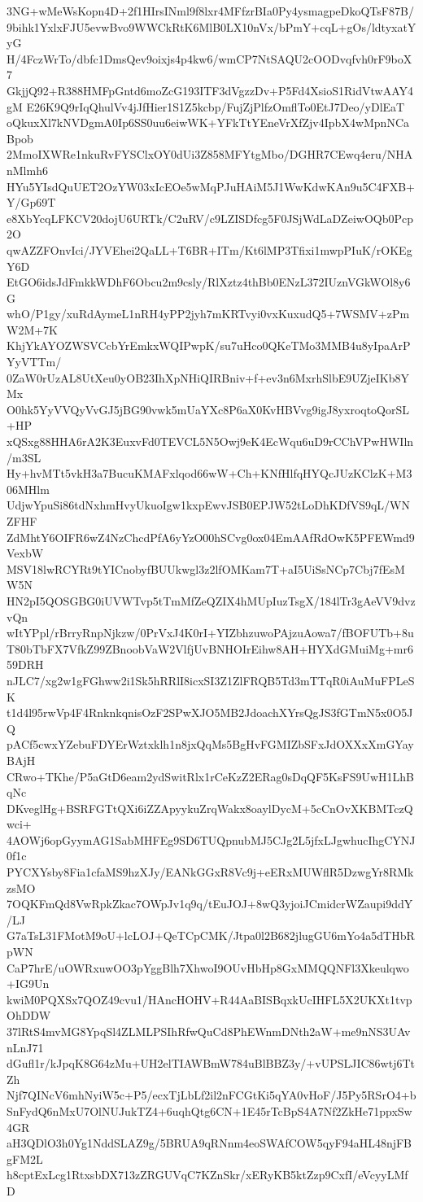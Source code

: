 3NG+wMeWsKopn4D+2f1HIrsINml9f8lxr4MFfzrBIa0Py4ysmagpeDkoQTsF87B/
9bihk1YxlxFJU5evwBvo9WWCkRtK6MlB0LX10nVx/bPmY+cqL+gOs/ldtyxatYyG
H/4FczWrTo/dbfc1DmsQev9oixjs4p4kw6/wmCP7NtSAQU2cOODvqfvh0rF9boX7
GkjjQ92+R388HMFpGntd6moZcG193ITF3dVgzzDv+P5Fd4XsioS1RidVtwAAY4gM
E26K9Q9rIqQhulVv4jJfHier1S1Z5kcbp/FujZjPlfzOmflTo0EtJ7Deo/yDlEaT
oQkuxXl7kNVDgmA0Ip6SS0uu6eiwWK+YFkTtYEneVrXfZjv4IpbX4wMpnNCaBpob
2MmoIXWRe1nkuRvFYSClxOY0dUi3Z858MFYtgMbo/DGHR7CEwq4eru/NHAnMlmh6
HYu5YIsdQuUET2OzYW03xIcEOe5wMqPJuHAiM5J1WwKdwKAn9u5C4FXB+Y/Gp69T
e8XbYcqLFKCV20dojU6URTk/C2uRV/c9LZISDfcg5F0JSjWdLaDZeiwOQb0Pcp2O
qwAZZFOnvIci/JYVEhei2QaLL+T6BR+ITm/Kt6lMP3Tfixi1mwpPIuK/rOKEgY6D
EtGO6idsJdFmkkWDhF6Obcu2m9csly/RlXztz4thBb0ENzL372IUznVGkWOl8y6G
whO/P1gy/xuRdAymeL1nRH4yPP2jyh7mKRTvyi0vxKuxudQ5+7WSMV+zPmW2M+7K
KhjYkAYOZWSVCcbYrEmkxWQIPwpK/su7uHco0QKeTMo3MMB4u8yIpaArPYyVTTm/
0ZaW0rUzAL8UtXeu0yOB23IhXpNHiQIRBniv+f+ev3n6MxrhSlbE9UZjeIKb8YMx
O0hk5YyVVQyVvGJ5jBG90vwk5mUaYXc8P6aX0KvHBVvg9igJ8yxroqtoQorSL+HP
xQSxg88HHA6rA2K3EuxvFd0TEVCL5N5Owj9eK4EcWqu6uD9rCChVPwHWIln/m3SL
Hy+hvMTt5vkH3a7BucuKMAFxlqod66wW+Ch+KNfHlfqHYQcJUzKClzK+M306MHlm
UdjwYpuSi86tdNxhmHvyUkuoIgw1kxpEwvJSB0EPJW52tLoDhKDfVS9qL/WNZFHF
ZdMhtY6OIFR6wZ4NzChcdPfA6yYzO00hSCvg0ox04EmAAfRdOwK5PFEWmd9VexbW
MSV18lwRCYRt9tYICnobyfBUUkwgl3z2lfOMKam7T+aI5UiSsNCp7Cbj7fEsMW5N
HN2pI5QOSGBG0iUVWTvp5tTmMfZeQZIX4hMUpIuzTsgX/184lTr3gAeVV9dvzvQn
wItYPpl/rBrryRnpNjkzw/0PrVxJ4K0rI+YIZbhzuwoPAjzuAowa7/fBOFUTb+8u
T80bTbFX7VfkZ99ZBnoobVaW2VlfjUvBNHOIrEihw8AH+HYXdGMuiMg+mr659DRH
nJLC7/xg2w1gFGhww2i1Sk5hRRlI8icxSI3Z1ZlFRQB5Td3mTTqR0iAuMuFPLeSK
t1d4l95rwVp4F4RnknkqnisOzF2SPwXJO5MB2JdoachXYrsQgJS3fGTmN5x0O5JQ
pACf5cwxYZebuFDYErWztxklh1n8jxQqMs5BgHvFGMIZbSFxJdOXXxXmGYayBAjH
CRwo+TKhe/P5aGtD6eam2ydSwitRlx1rCeKzZ2ERag0sDqQF5KsFS9UwH1LhBqNc
DKveglHg+BSRFGTtQXi6iZZApyykuZrqWakx8oaylDycM+5cCnOvXKBMTczQwci+
4AOWj6opGyymAG1SabMHFEg9SD6TUQpnubMJ5CJg2L5jfxLJgwhucIhgCYNJ0f1c
PYCXYsby8Fia1cfaMS9hzXJy/EANkGGxR8Vc9j+eERxMUWflR5DzwgYr8RMkzsMO
7OQKFmQd8VwRpkZkac7OWpJv1q9q/tEuJOJ+8wQ3yjoiJCmidcrWZaupi9ddY/LJ
G7aTsL31FMotM9oU+lcLOJ+QeTCpCMK/Jtpa0l2B682jlugGU6mYo4a5dTHbRpWN
CaP7hrE/uOWRxuwOO3pYggBlh7XhwoI9OUvHbHp8GxMMQQNFl3Xkeulqwo+IG9Un
kwiM0PQXSx7QOZ49cvu1/HAncHOHV+R44AaBISBqxkUcIHFL5X2UKXt1tvpOhDDW
37lRtS4mvMG8YpqSl4ZLMLPSIhRfwQuCd8PhEWnmDNth2aW+me9nNS3UAvnLnJ71
dGufl1r/kJpqK8G64zMu+UH2elTIAWBmW784uBlBBZ3y/+vUPSLJIC86wtj6TtZh
Njf7QINcV6mhNyiW5c+P5/ecxTjLbLf2il2nFCGtKi5qYA0vHoF/J5Py5RSrO4+b
SnFydQ6nMxU7OlNUJukTZ4+6uqhQtg6CN+1E45rTcBpS4A7Nf2ZkHe71ppxSw4GR
aH3QDlO3h0Yg1NddSLAZ9g/5BRUA9qRNnm4eoSWAfCOW5qyF94aHL48njFBgFM2L
h8cptExLcg1RtxsbDX713zZRGUVqC7KZnSkr/xERyKB5ktZzp9CxfI/eVcyyLMfD
